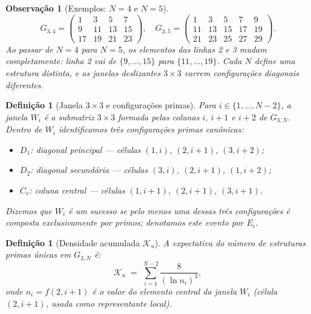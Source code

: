 \documentclass{article}
\newtheorem{remark}[proposition]{Observação}
\newtheorem{definition}[proposition]{Definição}
\begin{document}
	\begin{remark}[Exemplos: $N = 4$ e $N = 5$]
		\label{rem:exemplos}
		\[
		G_{3,4} = \begin{pmatrix}
			1 & 3 & 5 & 7 \\ 9 & 11 & 13 & 15 \\ 17 & 19 & 21 & 23
		\end{pmatrix},
		\quad
		G_{3,5} = \begin{pmatrix}
			1 & 3 & 5 & 7 & 9 \\ 11 & 13 & 15 & 17 & 19 \\ 21 & 23 & 25 & 27 & 29
		\end{pmatrix}.
		\]
		Ao passar de $N=4$ para $N=5$, os elementos das linhas 2 e 3 mudam
		completamente: linha 2 vai de $\{9,\ldots,15\}$ para $\{11,\ldots,19\}$.
		Cada $N$ define uma estrutura distinta, e as janelas deslizantes $3\times 3$
		varrem configura\c{c}\~oes diagonais diferentes.
	\end{remark}
	
	\begin{definition}[Janela $3\times 3$ e configurações primas]
		\label{def:janela}
		Para $i \in \{1,\ldots, N-2\}$, a \emph{janela} $W_i$ é a
		submatriz $3 \times 3$ formada pelas colunas $i$, $i+1$ e $i+2$
		de $G_{3,N}$. Dentro de $W_i$ identificamos três
		\emph{configurações primas canônicas}:
		\begin{itemize}
			\item $D_1$: diagonal principal — células $(1,i)$, $(2,i+1)$,
			$(3,i+2)$;
			\item $D_2$: diagonal secundária — células $(3,i)$, $(2,i+1)$,
			$(1,i+2)$;
			\item $C_v$: coluna central — células $(1,i+1)$, $(2,i+1)$,
			$(3,i+1)$.
		\end{itemize}
		Dizemos que $W_i$ é um \emph{sucesso} se pelo menos uma dessas
		três configurações é composta exclusivamente por primos; denotamos
		este evento por $E_i$.
	\end{definition}
	
	\begin{definition}[Densidade acumulada $\mathcal{K}_u$]
		\label{def:ku}
		A \emph{expectativa do número de estruturas primas únicas} em
		$G_{3,N}$ é:
		\[
		\mathcal{K}_u \;=\; \sum_{i=1}^{N-2} \frac{8}{(\ln n_i)^3},
		\]
		onde $n_i = f(2, i+1)$ é o valor do elemento central da janela
		$W_i$ (célula $(2, i+1)$, usada como representante local).
	\end{definition}
	
\end{document}
